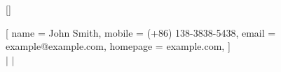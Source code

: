 \addtolength{\oddsidemargin}{-0.5in}
\addtolength{\evensidemargin}{-0.5in}
\addtolength{\textwidth}{1in}
\addtolength{\topmargin}{-.5in}
\addtolength{\textheight}{1.0in}

\raggedbottom
\raggedright

\setlength{\tabcolsep}{0in}

\titleformat{\section}{
  \resumeStyleSectionPaddingBefore\scshape\raggedright\large
}{}{0em}{}[\color{black}\titlerule]



\renewcommand{\labelitemii}{
    $\vcenter{\hbox{\tiny$\bullet$}}$
}

\newkeycommand{\resumeHeading}[
        name = John Smith,
        mobile = (+86) 138-3838-5438,
        email = example@example.com,
        homepage = example.com,
]{
    \newpage \textbf{\Huge {}}
    \\ \vspace{0.1em} \small {}
    $|$ \href{mailto:\commandkey{email}}{\underline{}}
    $|$ \href{https://\commandkey{homepage}}{\underline{}}
    \vspace{0.8em}
}

\newenvironment{resumeSection}[1]{
    \resumeStyleSectionPaddingBefore
    \section{#1}
    \begin{itemize}[leftmargin=0.007\textwidth, label={}]
}{
    \end{itemize}
    \resumeStyleSectionPaddingAfter
}

